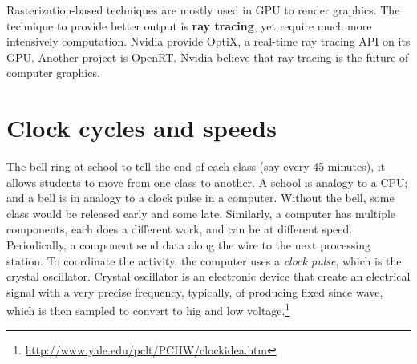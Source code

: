\begin{framed}
  Rasterization-based techniques are mostly used in GPU to render
  graphics. The technique to provide better output is {\bf ray tracing},
  yet require much more intensively computation. Nvidia provide OptiX, a
  real-time ray tracing API on its GPU. Another project is
  OpenRT. Nvidia believe that ray tracing is the future of computer
  graphics.
\end{framed}

\section{Clock cycles and speeds}
\label{sec:clock-cycles-speeds}

The bell ring at school to tell the end of each class (say every 45 minutes), it
allows students to move from one class to another. A school is analogy to a CPU;
and a bell is in analogy to a clock pulse in a computer. Without the bell, some
class would be released early and some late. Similarly, a computer has multiple
components, each does a different work, and can be at different speed.
Periodically, a component send data along the wire to the next processing
station. To coordinate the activity, the computer uses a {\it clock pulse},
which is the crystal oscillator. Crystal oscillator is an electronic device that
create an electrical signal with a very precise frequency, typically, of
producing fixed since wave, which is then sampled to convert to hig and low
voltage.\footnote{\url{http://www.yale.edu/pclt/PCHW/clockidea.htm}}

